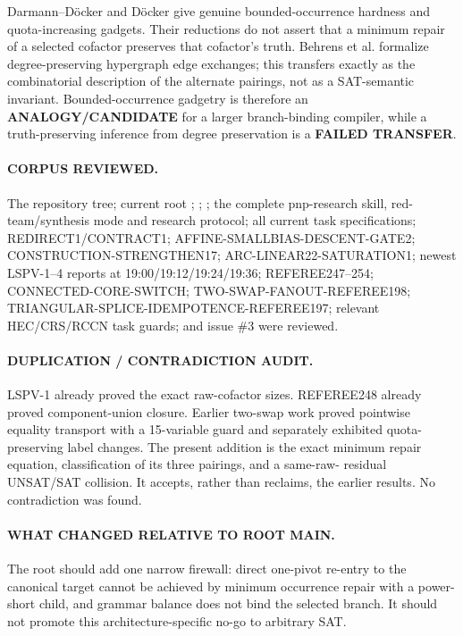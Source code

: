 \documentclass[11pt]{article}
\begin{document}
Darmann--D\"ocker and D\"ocker give genuine bounded-occurrence hardness and
quota-increasing gadgets.  Their reductions do not assert that a minimum
repair of a selected cofactor preserves that cofactor's truth.  Behrens
et al. formalize degree-preserving hypergraph edge exchanges; this transfers
exactly as the combinatorial description of the alternate pairings, not as a
SAT-semantic invariant.  Bounded-occurrence gadgetry is therefore an
\textbf{ANALOGY/CANDIDATE} for a larger branch-binding compiler, while a
truth-preserving inference from degree preservation is a \textbf{FAILED
TRANSFER}.

\paragraph{CORPUS REVIEWED.}
The repository tree; current root ; ;
; the complete pnp-research skill, red-team/synthesis mode and
research protocol; all current task specifications; REDIRECT1/CONTRACT1;
AFFINE-SMALLBIAS-DESCENT-GATE2; CONSTRUCTION-STRENGTHEN17;
ARC-LINEAR22-SATURATION1; newest LSPV-1--4 reports at 19:00/19:12/19:24/19:36;
REFEREE247--254; CONNECTED-CORE-SWITCH; TWO-SWAP-FANOUT-REFEREE198;
TRIANGULAR-SPLICE-IDEMPOTENCE-REFEREE197; relevant HEC/CRS/RCCN task guards;
and issue \#3 were reviewed.

\paragraph{DUPLICATION / CONTRADICTION AUDIT.}
LSPV-1 already proved the exact raw-cofactor sizes.  REFEREE248 already
proved component-union closure.  Earlier two-swap work proved pointwise
equality transport with a 15-variable guard and separately exhibited
quota-preserving label changes.  The present addition is the exact minimum
repair equation, classification of its three pairings, and a same-raw-
residual UNSAT/SAT collision.  It accepts, rather than reclaims, the earlier
results.  No contradiction was found.

\paragraph{WHAT CHANGED RELATIVE TO ROOT MAIN.}
The root should add one narrow firewall: direct one-pivot re-entry to the
canonical target cannot be achieved by minimum occurrence repair with a
power-short child, and grammar balance does not bind the selected branch.
It should not promote this architecture-specific no-go to arbitrary SAT.
\end{document}

